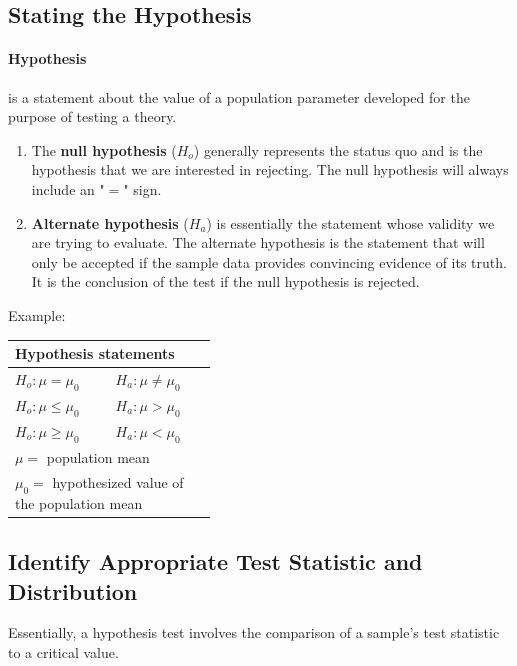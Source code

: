 \subsection{Stating the Hypothesis} %
\label{sub:Stating the Hypothesis}
\paragraph{Hypothesis} is a statement about the value of a population parameter developed for the purpose of testing a theory.
\begin{enumerate}
	\item The \textbf{null hypothesis} ($H_o$) generally represents the status quo and is the hypothesis that we are interested in rejecting.
	      The null hypothesis will always include an "$=$" sign.
	\item \textbf{Alternate hypothesis} ($H_a$) is essentially the statement whose validity we are trying to evaluate.
	      The alternate hypothesis is the statement that will only be accepted if the sample data provides convincing evidence of its truth.
	      It is the conclusion of the test if the null hypothesis is rejected.
\end{enumerate}
Example:
\begin{table}[h!]
	\begin{center}
		\label{tab:HypoStat}
		\begin{tabular}{p{0.2\linewidth} | p{0.2\linewidth}}
			\toprule
			\multicolumn{2}{l}{\textbf{Hypothesis statements}} \\
			\midrule
			$H_o: \mu = \mu_0$    & $H_a: \mu \neq \mu_0$      \\
			\midrule
			$H_o: \mu \leq \mu_0$ & $H_a: \mu > \mu_0$         \\
			\midrule
			$H_o: \mu \geq \mu_0$ & $H_a: \mu < \mu_0$         \\
			\bottomrule
			\multicolumn{2}{l}{$\mu = $ population mean}       \\
			\multicolumn{2}{l}{$\mu_0 = $ hypothesized value of the population mean}
		\end{tabular}
	\end{center}
\end{table}
\subsection{Identify Appropriate Test Statistic and Distribution} %
\label{sub:Identify Appropriate Test Statistic and Distribution}
Essentially, a hypothesis test involves the comparison of a sample's test statistic to a critical value.

